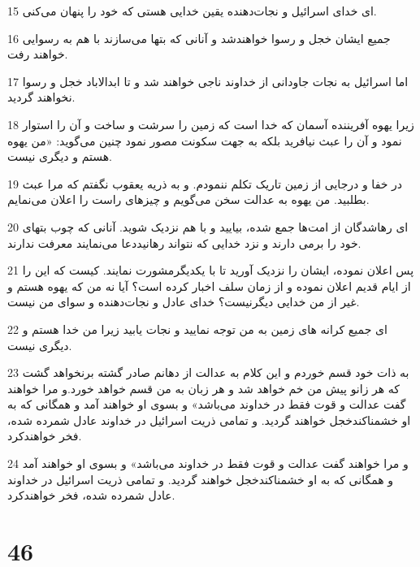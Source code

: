 \par 15 ‌ای خدای اسرائیل و نجات‌دهنده یقین خدایی هستی که خود را پنهان می‌کنی.
\par 16 جمیع ایشان خجل و رسوا خواهندشد و آنانی که بتها می‌سازند با هم به رسوایی خواهند رفت.
\par 17 اما اسرائیل به نجات جاودانی از خداوند ناجی خواهند شد و تا ابدالاباد خجل و رسوا نخواهند گردید.
\par 18 زیرا یهوه آفریننده آسمان که خدا است که زمین را سرشت و ساخت و آن را استوار نمود و آن را عبث نیافرید بلکه به جهت سکونت مصور نمود چنین می‌گوید: «من یهوه هستم و دیگری نیست.
\par 19 در خفا و درجایی از زمین تاریک تکلم ننمودم. و به ذریه یعقوب نگفتم که مرا عبث بطلبید. من یهوه به عدالت سخن می‌گویم و چیزهای راست را اعلان می‌نمایم.
\par 20 ‌ای رهاشدگان از امت‌ها جمع شده، بیایید و با هم نزدیک شوید. آنانی که چوب بتهای خود را برمی دارند و نزد خدایی که نتواند رهانیددعا می‌نمایند معرفت ندارند.
\par 21 پس اعلان نموده، ایشان را نزدیک آورید تا با یکدیگرمشورت نمایند. کیست که این را از ایام قدیم اعلان نموده و از زمان سلف اخبار کرده است؟ آیا نه من که یهوه هستم و غیر از من خدایی دیگرنیست؟ خدای عادل و نجات‌دهنده و سوای من نیست.
\par 22 ‌ای جمیع کرانه های زمین به من توجه نمایید و نجات یابید زیرا من خدا هستم و دیگری نیست.
\par 23 به ذات خود قسم خوردم و این کلام به عدالت از دهانم صادر گشته برنخواهد گشت که هر زانو پیش من خم خواهد شد و هر زبان به من قسم خواهد خورد.و مرا خواهند گفت عدالت و قوت فقط در خداوند می‌باشد» و بسوی او خواهند آمد و همگانی که به او خشمناکندخجل خواهند گردید. و تمامی ذریت اسرائیل در خداوند عادل شمرده شده، فخر خواهندکرد. 
\par 24 و مرا خواهند گفت عدالت و قوت فقط در خداوند می‌باشد» و بسوی او خواهند آمد و همگانی که به او خشمناکندخجل خواهند گردید. و تمامی ذریت اسرائیل در خداوند عادل شمرده شده، فخر خواهندکرد.
 
\chapter{46}

